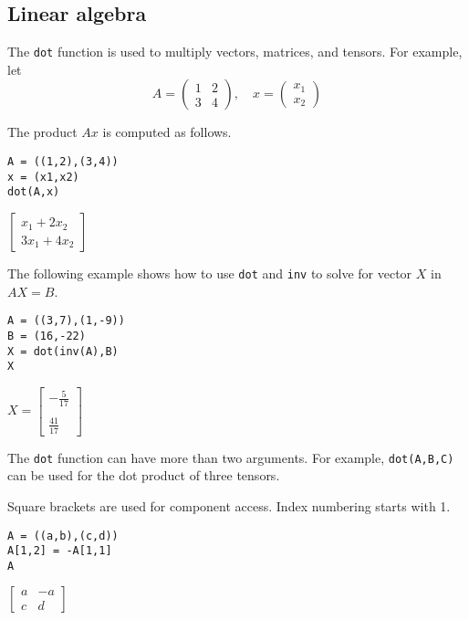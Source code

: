 \subsection{Linear algebra}

The \verb$dot$ function is used to multiply vectors, matrices, and tensors.
For example, let
\begin{equation*}
A=\begin{pmatrix}1&2\\3&4\end{pmatrix},
\quad
x=\begin{pmatrix}x_1\\x_2\end{pmatrix}
\end{equation*}

\noindent
The product $Ax$ is computed as follows.

{\color{blue}
\begin{verbatim}
A = ((1,2),(3,4))
x = (x1,x2)
dot(A,x)
\end{verbatim}
}

\noindent
$\displaystyle
\begin{bmatrix}
x_1+2x_2
\\[1ex]
3x_1+4x_2
\end{bmatrix}
$

\bigskip
\noindent
The following example shows how to use \verb$dot$ and \verb$inv$ to solve for
vector $X$ in $AX=B$.

{\color{blue}
\begin{verbatim}
A = ((3,7),(1,-9))
B = (16,-22)
X = dot(inv(A),B)
X
\end{verbatim}
}

\noindent
$\displaystyle
X=
\begin{bmatrix}
-\tfrac{5}{17}
\\
\\
\tfrac{41}{17}
\end{bmatrix}
$

\bigskip
\noindent
The \verb$dot$ function can have more than two arguments.
For example, \verb$dot(A,B,C)$ can be used for the dot product of three tensors.

\bigskip
\noindent
Square brackets are used for component access.
Index numbering starts with 1.

{\color{blue}
\begin{verbatim}
A = ((a,b),(c,d))
A[1,2] = -A[1,1]
A
\end{verbatim}
}

\noindent
$\displaystyle
\begin{bmatrix}
a & -a
\\[1ex]
c & d
\end{bmatrix}
$

